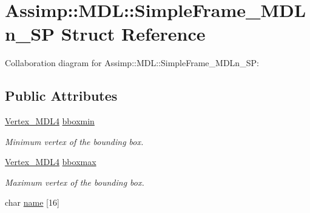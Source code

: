 \hypertarget{struct_assimp_1_1_m_d_l_1_1_simple_frame___m_d_ln___s_p}{\section{Assimp\+:\+:M\+D\+L\+:\+:Simple\+Frame\+\_\+\+M\+D\+Ln\+\_\+\+S\+P Struct Reference}
\label{struct_assimp_1_1_m_d_l_1_1_simple_frame___m_d_ln___s_p}
}


Collaboration diagram for Assimp\+:\+:M\+D\+L\+:\+:Simple\+Frame\+\_\+\+M\+D\+Ln\+\_\+\+S\+P\+:
\subsection*{Public Attributes}
\begin{DoxyCompactItemize}
\item 
\hypertarget{struct_assimp_1_1_m_d_l_1_1_simple_frame___m_d_ln___s_p_ac518eb00c4d92930522c87f8bbf1f2e8}{\hyperlink{struct_assimp_1_1_m_d_l_1_1_vertex___m_d_l4}{Vertex\+\_\+\+M\+D\+L4} \hyperlink{struct_assimp_1_1_m_d_l_1_1_simple_frame___m_d_ln___s_p_ac518eb00c4d92930522c87f8bbf1f2e8}{bboxmin}}\label{struct_assimp_1_1_m_d_l_1_1_simple_frame___m_d_ln___s_p_ac518eb00c4d92930522c87f8bbf1f2e8}

\begin{DoxyCompactList}\small\item\em Minimum vertex of the bounding box. \end{DoxyCompactList}\item 
\hypertarget{struct_assimp_1_1_m_d_l_1_1_simple_frame___m_d_ln___s_p_a3002c81f4a0e6460d877bca0108e4e1c}{\hyperlink{struct_assimp_1_1_m_d_l_1_1_vertex___m_d_l4}{Vertex\+\_\+\+M\+D\+L4} \hyperlink{struct_assimp_1_1_m_d_l_1_1_simple_frame___m_d_ln___s_p_a3002c81f4a0e6460d877bca0108e4e1c}{bboxmax}}\label{struct_assimp_1_1_m_d_l_1_1_simple_frame___m_d_ln___s_p_a3002c81f4a0e6460d877bca0108e4e1c}

\begin{DoxyCompactList}\small\item\em Maximum vertex of the bounding box. \end{DoxyCompactList}\item 
\hypertarget{struct_assimp_1_1_m_d_l_1_1_simple_frame___m_d_ln___s_p_af5f8d53864520968cb6813118d68d72d}{char \hyperlink{struct_assimp_1_1_m_d_l_1_1_simple_frame___m_d_ln___s_p_af5f8d53864520968cb6813118d68d72d}{name} \mbox{[}16\mbox{]}}\label{struct_assimp_1_1_m_d_l_1_1_simple_frame___m_d_ln___s_p_af5f8d53864520968cb6813118d68d72d}


\end{DoxyCompactItemize}

